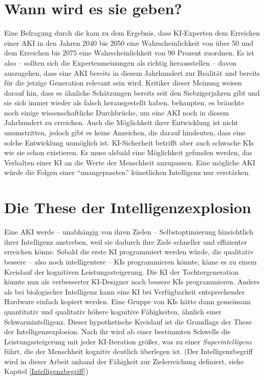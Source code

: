 \section{Wann wird es sie geben?} \label{akidatum}
Eine Befragung durch die \citeauthor{muller_future_2016} kam zu dem Ergebnis, dass KI-Experten dem Erreichen einer AKI in den Jahren 2040 bis 2050 eine Wahrscheinlichkeit von über 50 und dem Erreichen bis 2075 eine Wahrscheinlichkeit von 90 Prozent zuordnen.  Es ist also -- sollten sich die Expertenmeinungen als richtig herausstellen -- davon auszugehen, dass eine AKI bereits in diesem Jahrhundert zur Realität und bereits für die jetzige Generation relevant sein wird. Kritiker dieser Meinung weisen darauf hin, dass es ähnliche Schätzungen bereits seit den Siebzigerjahren gibt und sie sich immer wieder als falsch herausgestellt haben. \citeauthor{allen_paul_2011} behaupten, es bräuchte noch einige wissenschaftliche Durchbrüche, um eine AKI noch in diesem Jahrhundert zu erreichen.  Auch die Möglichkeit ihrer Entwicklung ist nicht unumstritten, jedoch gibt es keine Anzeichen, die darauf hindeuten, dass eine solche Entwicklung unmöglich ist. KI-Sicherheit betrifft aber auch schwache KIs wie sie schon existieren. Es muss alsbald eine Möglichkeit gefunden werden, das Verhalten einer KI an die Werte der Menschheit anzupassen. Eine mögliche AKI würde die Folgen einer \enquote{unangepassten} künstlichen Intelligenz nur verstärken.

\section{Die These der Intelligenzexplosion}
Eine AKI werde -- unabhängig von ihren Zielen -- Selbstoptimierung hinsichtlich ihrer Intelligenz anstreben, weil sie dadurch ihre Ziele schneller und effizienter erreichen könne. Sobald die erste KI programmiert werden würde, die qualitativ bessere -- also noch intelligentere -- KIs programmieren könnte, käme es zu einem Kreislauf der kognitiven Leistungssteigerung. Die KI der Tochtergeneration könnte nun als verbesserter KI-Designer noch bessere KIs programmieren. Anders als bei biologischer Intelligenz kann eine KI bei Verfügbarkeit entsprechender Hardware einfach kopiert werden. Eine Gruppe von KIs hätte dann gemeinsam quantitativ und qualitativ höhere kognitive Fähigkeiten, ähnlich einer Schwarmintelligenz. Dieser hypothetische Kreislauf ist die Grundlage der These der Intelligenzexplosion. Nach ihr wird ab einer bestimmten Schwelle die Leistungssteigerung mit jeder KI-Iteration größer, was zu einer \emph{Superintelligenz} führt, die der Menschheit kognitiv deutlich überlegen ist. (Der Intelligenzbegriff wird in dieser Arbeit anhand der Fähigkeit zur Zielerreichung definiert, siehe Kapitel \ref{Intelligenzbegriff}) 

